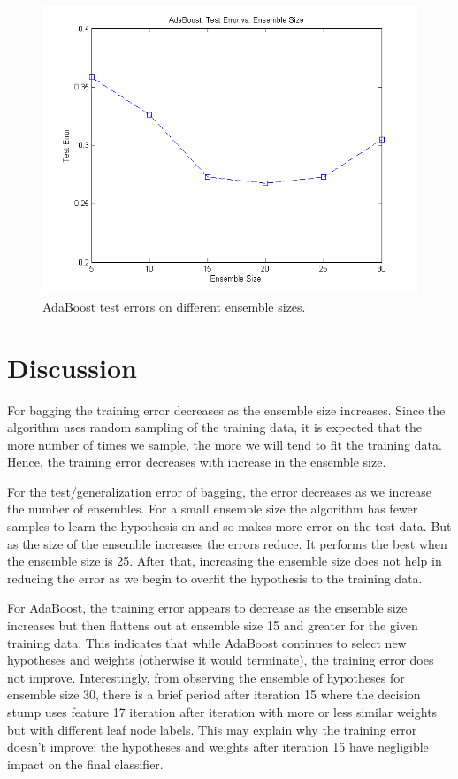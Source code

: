 \documentclass[12pt]{article}
\begin{document}
\begin{figure}[!t]
  \centering
  \includegraphics[scale=.6]{img/adaboost_testerrors.png}
  \caption{AdaBoost test errors on different ensemble sizes.}
  \label{fig:adaboost_testerrors}
\end{figure}

\section{Discussion}
For bagging the training error decreases as the ensemble size increases. Since the algorithm uses random sampling of the training data, it is expected that the more number of times we sample, the more we will tend to fit the training data. Hence, the training error decreases with increase in the ensemble size.

For the test/generalization error of bagging, the error decreases as we increase the number of ensembles. For a small ensemble size the algorithm has fewer samples to learn the hypothesis on and so makes more error on the test data. But as the size of the ensemble increases the errors reduce. It performs the best when the ensemble size is 25. After that, increasing the ensemble size does not help in reducing the error as we begin to overfit the hypothesis to the training data.

For AdaBoost, the training error appears to decrease as the ensemble size increases but then flattens out at ensemble size 15 and greater for the given training data. This indicates that while AdaBoost continues to select new hypotheses and weights (otherwise it would terminate), the training error does not improve. Interestingly, from observing the ensemble of hypotheses for ensemble size 30, there is a brief period after iteration 15 where the decision stump uses feature 17 iteration after iteration with more or less similar weights but with different leaf node labels. This may explain why the training error doesn't improve; the hypotheses and weights after iteration 15 have negligible impact on the final classifier.
\end{document}

